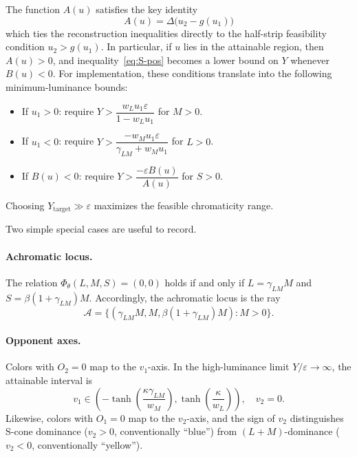 \documentclass[11pt]{article}
\theoremstyle{plain}
\theoremstyle{definition}
\theoremstyle{remark}
\begin{document}
The function $A(u)$ satisfies the key identity
\begin{equation}
A(u) = \Delta \bigl( u_2 - g(u_1) \bigr)
\end{equation}
which ties the reconstruction inequalities directly to the half-strip feasibility condition $u_2 > g(u_1)$. In particular, if $u$ lies in the attainable region, then $A(u) > 0$, and inequality~\eqref{eq:S-pos} becomes a lower bound on $Y$ whenever $B(u) < 0$. For implementation, these conditions translate into the following minimum-luminance bounds:
\begin{itemize}
    \item If $u_1 > 0$: require $Y > \dfrac{w_L u_1 \varepsilon}{1 - w_L u_1}$ for $M > 0$.
    \item If $u_1 < 0$: require $Y > \dfrac{-w_M u_1 \varepsilon}{\gamma_{LM} + w_M u_1}$ for $L > 0$.
    \item If $B(u) < 0$: require $Y > \dfrac{-\varepsilon B(u)}{A(u)}$ for $S > 0$.
\end{itemize}
Choosing $Y_{\mathrm{target}} \gg \varepsilon$ maximizes the feasible chromaticity range.

Two simple special cases are useful to record.

\paragraph{Achromatic locus.} The relation $\Phi_\theta(L,M,S) = (0,0)$ holds if and only if $L = \gamma_{LM} M$ and $S = \beta(1 + \gamma_{LM})M$. Accordingly, the achromatic locus is the ray
\begin{equation}
\mathcal{A} = \{ (\gamma_{LM} M, M, \beta(1+\gamma_{LM})M) : M > 0 \}.
\end{equation}

\paragraph{Opponent axes.} Colors with $O_2 = 0$ map to the $v_1$-axis. In the high-luminance limit $Y/\varepsilon \to \infty$, the attainable interval is
\begin{equation}
v_1 \in \left( -\tanh\left(\frac{\kappa\gamma_{LM}}{w_M}\right), \tanh\left(\frac{\kappa}{w_L}\right) \right), \quad v_2 = 0.
\end{equation}
Likewise, colors with $O_1 = 0$ map to the $v_2$-axis, and the sign of $v_2$ distinguishes S-cone dominance ($v_2 > 0$, conventionally ``blue'') from $(L+M)$-dominance ($v_2 < 0$, conventionally ``yellow'').
\end{document}
